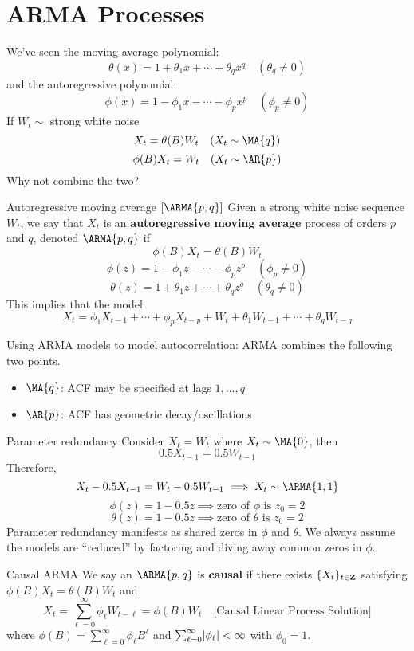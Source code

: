 \section{ARMA Processes}
We've seen the moving average polynomial:
\[ \theta(x)=1+\theta_1 x+\cdots+\theta_q x^q\quad(\theta_q\ne 0) \]
and the autoregressive polynomial:
\[ \phi(x)=1-\phi_1 x-\cdots - \phi_p x^p\quad(\phi_p\ne 0) \]
If $ W_t\sim $ strong white noise
\[ X_t=\theta(B)W_t\quad(X_t\sim \MA{q}) \]
\[ \phi(B)X_t=W_t\quad(X_t\sim\AR{p}) \]
Why not combine the two?
\begin{Definition}{Autoregressive moving average $ [\ARMA{p,q}] $}{}
    Given a strong white noise sequence $ W_t $, we say
    that $ X_t $ is an \textbf{autoregressive moving average} process
    of orders $ p $ and $ q $, denoted $ \ARMA{p,q} $ if
    \[ \phi(B)X_t=\theta(B)W_t \]
    \[ \phi(z)=1-\phi_1 z-\cdots - \phi_p z^p\quad (\phi_p\ne 0) \]
    \[ \theta(z)=1+\theta_1 z+\cdots+\theta_q z^q \quad (\theta_q\ne 0) \]
    This implies that the model
    \[ X_t=\phi_1X_{t-1}+\cdots+\phi_p X_{t-p}+
        W_t+\theta_1 W_{t-1}+\cdots+\theta_q W_{t-q} \]
\end{Definition}
Using ARMA models to model autocorrelation: ARMA combines the
following two points.
\begin{itemize}
    \item $ \MA{q} $: ACF may be specified at lags $ 1,\ldots,q $
    \item $ \AR{p} $: ACF has geometric decay/oscillations
\end{itemize}
\begin{Remark}{Parameter redundancy}{}
    Consider $ X_t=W_t $ where $ X_t\sim \MA{0} $, then
    \[ 0.5 X_{t-1}=0.5 W_{t-1} \]
    Therefore,
    \[ X_t-0.5 X_{t-1}=W_{t}-0.5W_{t-1}\implies X_t\sim \ARMA{1,1} \]
    \[ \phi(z)=1-0.5z\implies \text{zero of $\phi$ is }z_0=2 \]
    \[ \theta(z)=1-0.5z\implies \text{zero of $\theta$ is }z_0=2 \]
    Parameter redundancy manifests as shared zeros in $ \phi $
    and $ \theta $. We always assume the models are ``reduced''
    by factoring and diving away common zeros in $ \phi $.
\end{Remark}
\begin{Definition}{Causal ARMA}{}
    We say an $ \ARMA{p,q} $ is \textbf{causal} if there exists $ \{X_t\}_{t\in\mathbf{Z}} $
    satisfying $ \phi(B)X_t=\theta(B)W_{t}$ and
    \[ X_t=\sum_{\ell=0}^{\infty} \phi_\ell W_{t-\ell}=\phi(B)W_t \quad\text{[Causal Linear Process Solution]} \]
    where $ \phi(B)=\sum_{\ell=0}^{\infty} \phi_\ell B^\ell $
    and $ \sum_{\ell=0}^{\infty} \lvert\phi_\ell\rvert<\infty $ with
    $ \phi_0=1 $.
\end{Definition}
